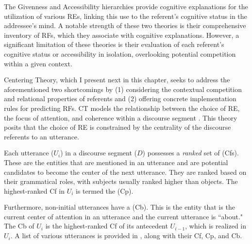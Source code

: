 The Givenness and Accessibility hierarchies provide cognitive explanations for the utilization of various REs, linking this use to the referent's cognitive status in the addressee's mind. A notable strength of these two theories is their comprehensive inventory of RFs, which they associate with cognitive explanations. However, a significant limitation of these theories is their evaluation of each referent's cognitive status or accessibility in isolation, overlooking potential competition within a given context.

Centering Theory, which I present next in this chapter, seeks to address the aforementioned two shortcomings by (1) considering the contextual competition and relational properties of referents and (2) offering concrete implementation rules for predicting RFs. CT models the relationship between the choice of RE, the focus of attention, and coherence within a discourse segment \citep{grosz1995centering}. This theory posits that the choice of RE is constrained by the centrality of the discourse referents to an utterance. 

Each utterance ($U_{i}$) in a discourse segment ($D$) possesses a \textit{ranked} set of  (Cfs). These are the entities that are mentioned in an utterance and are potential candidates to become the center of the next utterance. They are ranked based on their grammatical roles, with subjects usually ranked higher than objects. The highest-ranked Cf in $U_{i}$ is termed the  (Cp).

Furthermore, non-initial utterances have a  (Cb). This is the entity that is the current center of attention in an utterance and the current utterance is ``about." The Cb of $U_{i}$ is the highest-ranked Cf of its antecedent $U_{i-1}$, which is realized in $U_{i}$. A list of various utterances is provided in , along with their Cf, Cp, and Cb.

